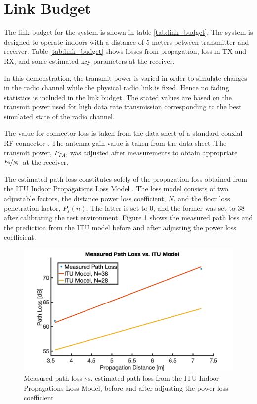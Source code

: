 \section{Link Budget}
\label{sec:link_budget}
The link budget for the system is shown in table \ref{tab:link_budget}. The system is designed to operate indoors with a distance of 5 meters between transmitter and receiver. Table \ref{tab:link_budget} shows losses from propagation, loss in TX and RX, and some estimated key parameters at the receiver. 

In this demonstration, the transmit power is varied in order to simulate changes in the radio channel while the physical radio link is fixed. Hence no fading statistics is included in the link budget. The stated values are based on the transmit power used for high data rate transmission corresponding to the best simulated state of the radio channel. 



The value for connector loss is taken from the data sheet of a standard coaxial RF connector \cite{rfconnector}. The antenna gain value is taken from the data sheet \cite{antenna}.The transmit power, $P_{PA}$, was adjusted after measurements to obtain appropriate $\nicefrac{E_b}{N_0}$ at the receiver.

The estimated path loss constitutes solely of the propagation loss obtained from the ITU Indoor Propagations Loss Model \cite{itu_model}. The loss model consists of two adjustable factors, the distance power loss coefficient, $N$, and the floor loss penetration factor, $P_f(n)$. The latter is set to 0, and the former was set to 38 after calibrating the test environment. Figure \ref{fig:path_loss} shows the measured path loss and the prediction from the ITU model before and after adjusting the power loss coefficient.

\begin{figure}[htbp]
\begin{center}
\includegraphics[width=0.85\linewidth]{PathLoss.png}
\caption{Measured path loss vs. estimated path loss from the ITU Indoor Propagations Loss Model, before and after adjusting the power loss coefficient}
\label{fig:path_loss}
\end{center}
\end{figure}

